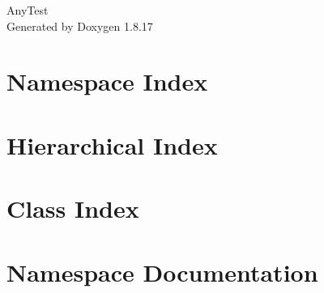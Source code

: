 \let\mypdfximage\pdfximage\def\pdfximage{\immediate\mypdfximage}\documentclass[twoside]{book}
\newcommand{\+}{\discretionary{\mbox{\scriptsize$\hookleftarrow$}}{}{}}
\newcommand{\clearemptydoublepage}{%
  \newpage{\pagestyle{empty}\cleardoublepage}%
}
\begin{document}
\hypersetup{pageanchor=false,
             bookmarksnumbered=true,
             pdfencoding=unicode
            }
\begin{titlepage}
\vspace*{7cm}
\begin{center}%
{\Large Any\+Test }\\
\vspace*{1cm}
{\large Generated by Doxygen 1.8.17}\\
\end{center}
\end{titlepage}
\clearemptydoublepage
{}
\tableofcontents
\clearemptydoublepage
{}
\hypersetup{pageanchor=true}

\chapter{Namespace Index}

\chapter{Hierarchical Index}

\chapter{Class Index}

\chapter{Namespace Documentation}













\end{document}
